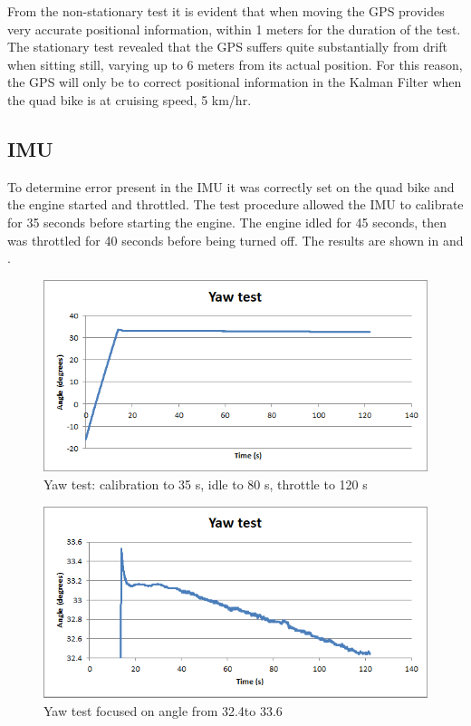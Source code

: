 \documentclass[main.tex]{subfiles}
\begin{document}
From the non-stationary test it is evident that when moving the GPS provides very accurate positional information, within 1 meters for the duration of the test. The stationary test revealed that the GPS suffers quite substantially from drift when sitting still, varying up to 6 meters from its actual position. For this reason, the GPS will only be to correct positional information in the Kalman Filter when the quad bike is at cruising speed, 5 km/hr.

\subsection{IMU}
To determine error present in the IMU it was correctly set on the quad bike and the engine started and throttled. The test procedure allowed the IMU to calibrate for 35 seconds before starting the engine. The engine idled for 45 seconds, then was throttled for 40 seconds before being turned off. The results are shown in  and .
\begin{figure}[ht]
\includegraphics[width=1\textwidth]{5-Testing/yawTest.png}
\centering
\caption{Yaw test: calibration to 35 s, idle to 80 s, throttle to 120 s}
\end{figure}
\begin{figure}[ht]
\includegraphics[width=1\textwidth]{5-Testing/yawTestZoomed.png}
\centering
\caption{Yaw test focused on angle from 32.4\degree to 33.6\degree}
\end{figure}
\end{document}
